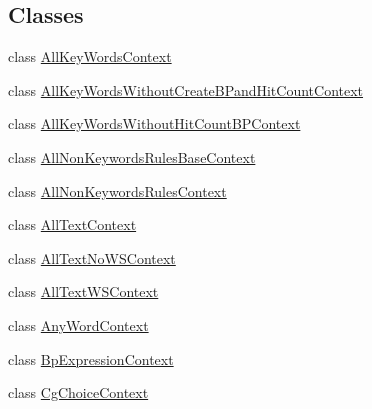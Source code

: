 \subsection*{Classes}
\begin{DoxyCompactItemize}
\item 
class \hyperlink{classgov_1_1nasa_1_1jpf_1_1inspector_1_1client_1_1parser_1_1_console_grammar_parser_1_1_all_key_words_context}{All\+Key\+Words\+Context}
\item 
class \hyperlink{classgov_1_1nasa_1_1jpf_1_1inspector_1_1client_1_1parser_1_1_console_grammar_parser_1_1_all_key_5423188b2439879f44801649cdee10f6}{All\+Key\+Words\+Without\+Create\+B\+Pand\+Hit\+Count\+Context}
\item 
class \hyperlink{classgov_1_1nasa_1_1jpf_1_1inspector_1_1client_1_1parser_1_1_console_grammar_parser_1_1_all_key_4612626c1f72cea22831f9624187dc64}{All\+Key\+Words\+Without\+Hit\+Count\+B\+P\+Context}
\item 
class \hyperlink{classgov_1_1nasa_1_1jpf_1_1inspector_1_1client_1_1parser_1_1_console_grammar_parser_1_1_all_non_keywords_rules_base_context}{All\+Non\+Keywords\+Rules\+Base\+Context}
\item 
class \hyperlink{classgov_1_1nasa_1_1jpf_1_1inspector_1_1client_1_1parser_1_1_console_grammar_parser_1_1_all_non_keywords_rules_context}{All\+Non\+Keywords\+Rules\+Context}
\item 
class \hyperlink{classgov_1_1nasa_1_1jpf_1_1inspector_1_1client_1_1parser_1_1_console_grammar_parser_1_1_all_text_context}{All\+Text\+Context}
\item 
class \hyperlink{classgov_1_1nasa_1_1jpf_1_1inspector_1_1client_1_1parser_1_1_console_grammar_parser_1_1_all_text_no_w_s_context}{All\+Text\+No\+W\+S\+Context}
\item 
class \hyperlink{classgov_1_1nasa_1_1jpf_1_1inspector_1_1client_1_1parser_1_1_console_grammar_parser_1_1_all_text_w_s_context}{All\+Text\+W\+S\+Context}
\item 
class \hyperlink{classgov_1_1nasa_1_1jpf_1_1inspector_1_1client_1_1parser_1_1_console_grammar_parser_1_1_any_word_context}{Any\+Word\+Context}
\item 
class \hyperlink{classgov_1_1nasa_1_1jpf_1_1inspector_1_1client_1_1parser_1_1_console_grammar_parser_1_1_bp_expression_context}{Bp\+Expression\+Context}
\item 
class \hyperlink{classgov_1_1nasa_1_1jpf_1_1inspector_1_1client_1_1parser_1_1_console_grammar_parser_1_1_cg_choice_context}{Cg\+Choice\+Context}
\item 

\end{DoxyCompactItemize}
